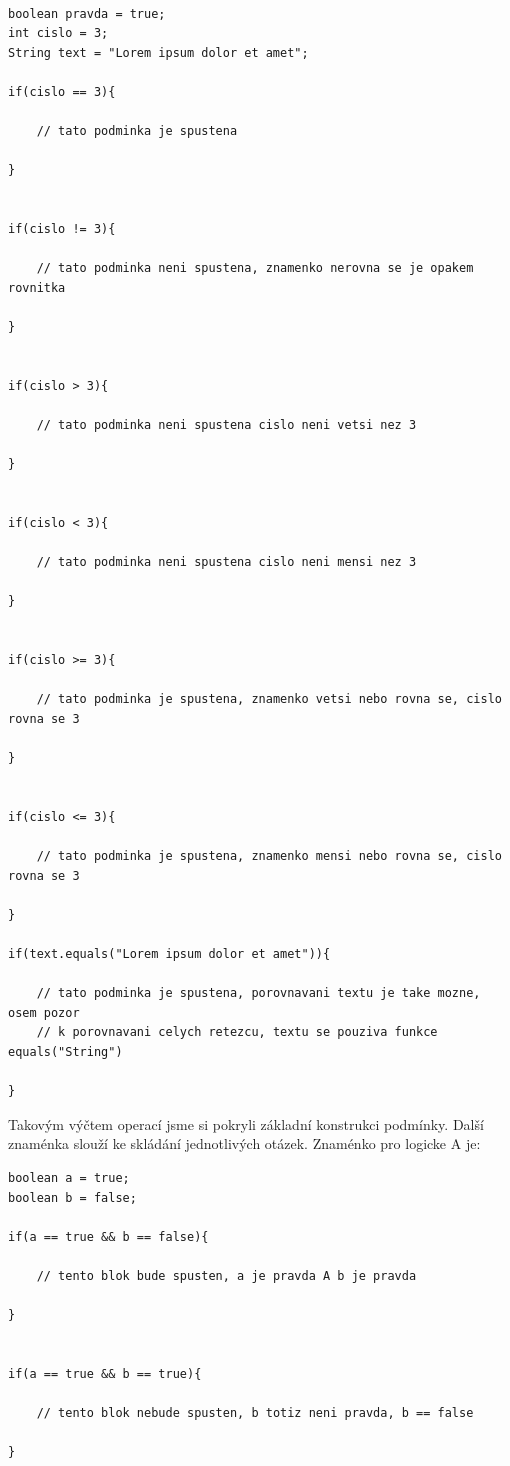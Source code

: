 \documentclass[11pt]{book}
\begin{document}
\begin{lstlisting}

boolean pravda = true;
int cislo = 3;
String text = "Lorem ipsum dolor et amet";

if(cislo == 3){

    // tato podminka je spustena

}


if(cislo != 3){

    // tato podminka neni spustena, znamenko nerovna se je opakem rovnitka

}


if(cislo > 3){

    // tato podminka neni spustena cislo neni vetsi nez 3

}


if(cislo < 3){

    // tato podminka neni spustena cislo neni mensi nez 3

}


if(cislo >= 3){

    // tato podminka je spustena, znamenko vetsi nebo rovna se, cislo rovna se 3

}


if(cislo <= 3){

    // tato podminka je spustena, znamenko mensi nebo rovna se, cislo rovna se 3

}

if(text.equals("Lorem ipsum dolor et amet")){

	// tato podminka je spustena, porovnavani textu je take mozne, osem pozor
	// k porovnavani celych retezcu, textu se pouziva funkce equals("String")

}

\end{lstlisting}

Takovým výčtem operací jsme si pokryli základní konstrukci podmínky. Další znaménka slouží ke skládání jednotlivých otázek. Znaménko pro logicke A je:

\begin{lstlisting}
boolean a = true;
boolean b = false;

if(a == true && b == false){

	// tento blok bude spusten, a je pravda A b je pravda

}


if(a == true && b == true){

	// tento blok nebude spusten, b totiz neni pravda, b == false

}

\end{lstlisting}
\end{document}
